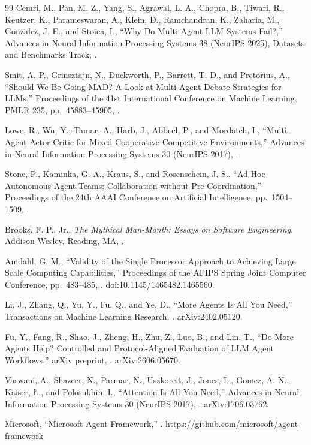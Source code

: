 \documentclass[11pt,a4paper]{article}
\begin{document}
\begin{thebibliography}{99}
\bibspace
{}
Cemri, M., Pan, M. Z., Yang, S., Agrawal, L. A., Chopra, B., Tiwari, R., Keutzer, K., Parameswaran, A., Klein, D., Ramchandran, K., Zaharia, M., Gonzalez, J. E., and Stoica, I.,
\newblock ``{Why Do Multi-Agent LLM Systems Fail?},''
\newblock Advances in Neural Information Processing Systems 38 (NeurIPS 2025), Datasets and Benchmarks Track,
.

\bibspace
{}
Smit, A. P., Grinsztajn, N., Duckworth, P., Barrett, T. D., and Pretorius, A.,
\newblock ``{Should We Be Going MAD? A Look at Multi-Agent Debate Strategies for LLMs},''
\newblock Proceedings of the 41st International Conference on Machine Learning, PMLR 235, pp.~45883--45905,
.

\bibspace
{}
Lowe, R., Wu, Y., Tamar, A., Harb, J., Abbeel, P., and Mordatch, I.,
\newblock ``{Multi-Agent Actor-Critic for Mixed Cooperative-Competitive Environments},''
\newblock Advances in Neural Information Processing Systems 30 (NeurIPS 2017),
.

\bibspace
{}
Stone, P., Kaminka, G. A., Kraus, S., and Rosenschein, J. S.,
\newblock ``{Ad Hoc Autonomous Agent Teams: Collaboration without Pre-Coordination},''
\newblock Proceedings of the 24th AAAI Conference on Artificial Intelligence, pp.~1504--1509,
.

\bibspace
{}
Brooks, F. P., Jr.,
\newblock \emph{The Mythical Man-Month: Essays on Software Engineering},
\newblock Addison-Wesley, Reading, MA,
.

\bibspace
{}
Amdahl, G. M.,
\newblock ``{Validity of the Single Processor Approach to Achieving Large Scale Computing Capabilities},''
\newblock Proceedings of the AFIPS Spring Joint Computer Conference, pp.~483--485,
.
\newblock doi:10.1145/1465482.1465560.

\bibspace
{}
Li, J., Zhang, Q., Yu, Y., Fu, Q., and Ye, D.,
\newblock ``{More Agents Is All You Need},''
\newblock Transactions on Machine Learning Research,
.
\newblock arXiv:2402.05120.

\bibspace
{}
Fu, Y., Fang, R., Shao, J., Zheng, H., Zhu, Z., Luo, B., and Lin, T.,
\newblock ``{Do More Agents Help? Controlled and Protocol-Aligned Evaluation of LLM Agent Workflows},''
\newblock arXiv preprint,
.
\newblock arXiv:2606.05670.

\bibspace
{}
Vaswani, A., Shazeer, N., Parmar, N., Uszkoreit, J., Jones, L., Gomez, A. N., Kaiser, {\L}., and Polosukhin, I.,
\newblock ``{Attention Is All You Need},''
\newblock Advances in Neural Information Processing Systems 30 (NeurIPS 2017),
.
\newblock arXiv:1706.03762.

\bibspace
{}
Microsoft,
\newblock ``{Microsoft Agent Framework},''
.
\newblock \url{https://github.com/microsoft/agent-framework}

\end{thebibliography}
%
\end{document}
